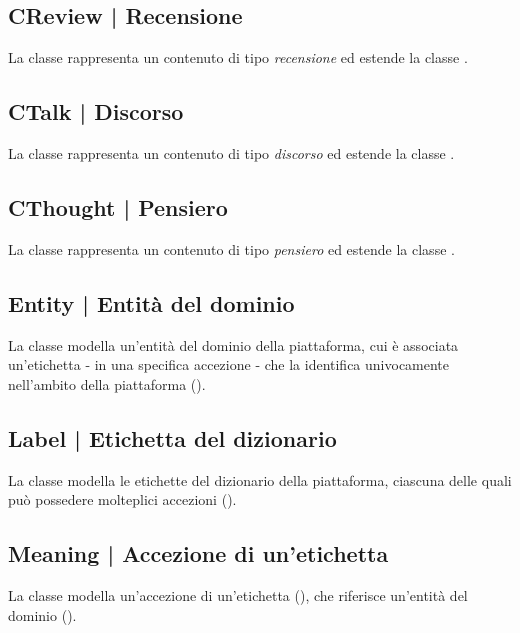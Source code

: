 \documentclass[10pt,a4paper,headinclude,footinclude,hidelinks]{scrreprt} %
\begin{document}
	\subsection[CReview]{CReview | Recensione}
	\label{sec:stage:design:sistema:model:review}
	La classe rappresenta un contenuto di tipo \textit{recensione} ed estende la classe \textit{}.

	\subsection[CTalk]{CTalk | Discorso}
	\label{sec:stage:design:sistema:model:talk}
	La classe rappresenta un contenuto di tipo \textit{discorso} ed estende la classe \textit{}.

	\subsection[CThought]{CThought | Pensiero}
	\label{sec:stage:design:sistema:model:thought}
	La classe rappresenta un contenuto di tipo \textit{pensiero} ed estende la classe \textit{}.

	\subsection[Entity]{Entity | Entità del dominio}
	\label{sec:stage:design:sistema:model:entity}
	La classe modella un'entità del dominio della piattaforma, cui è associata un'etichetta - in una specifica accezione - che la identifica univocamente nell'ambito della piattaforma (\textit{}).

	\subsection[Label]{Label | Etichetta del dizionario}
	\label{sec:stage:design:sistema:model:label}
	La classe modella le etichette del dizionario della piattaforma, ciascuna delle quali può possedere molteplici accezioni (\textit{}).

	\subsection[Meaning]{Meaning | Accezione di un'etichetta}
	\label{sec:stage:design:sistema:model:meaning}
	La classe modella un'accezione di un'etichetta (\textit{}), che riferisce un'entità del dominio (\textit{}).
\end{document}
